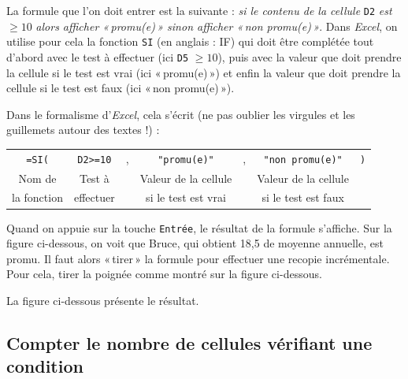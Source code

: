 La formule que l'on doit entrer est la suivante : \textsl{si le contenu de la cellule} \texttt{D2} \textsl{est} $\geqslant 10$ \textsl{alors afficher «\,promu(e)\,» sinon afficher «\,non promu(e)\,»}. Dans \emph{Excel}, on utilise pour cela la fonction \texttt{SI} (en anglais : IF) qui doit être complétée tout d'abord avec le test à effectuer (ici \texttt{D5} $\geqslant 10$), puis avec la valeur que doit prendre la cellule si le test est vrai (ici «\,promu(e)\,») et enfin la valeur que doit prendre la cellule si le test est faux (ici «\,non promu(e)\,»).

\vspace{1em}

Dans le formalisme d'\emph{Excel}, cela s'écrit (ne pas oublier les virgules et les guillemets autour des textes !) :

\begin{center}
	\begin{tabular}{ccccccc}
		\texttt{=SI(} & \texttt{D2>=10} & , & \texttt{"promu(e)"} & , & \texttt{"non promu(e)"} & \texttt{)} \\ 
		Nom de & Test à  & & Valeur de la cellule & & Valeur de la cellule & \\
		la fonction & effectuer & &  si le test est vrai & & si le test est faux & \\  
	\end{tabular}
\end{center}


Quand on appuie sur la touche \texttt{Entrée}, le résultat de la formule s'affiche. Sur la figure ci-dessous, on voit que Bruce, qui obtient 18,5 de moyenne annuelle, est promu. Il faut alors «\,tirer\,» la formule pour effectuer une recopie incrémentale. Pour cela, tirer la poignée comme montré sur la figure ci-dessous.


La figure ci-dessous présente le résultat.


\subsection{Compter le nombre de cellules vérifiant une condition}\label{Calc3NBSI}

